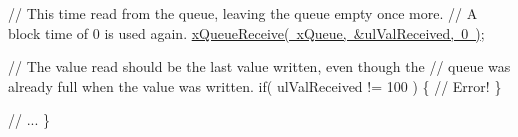 \begin{DoxyPre}    // This time read from the queue, leaving the queue empty once more.
    // A block time of 0 is used again.
    \mbox{\hyperlink{queue_8h_af1549eac0e7f05694a59a0b967c80be3}{xQueueReceive( xQueue, &ulValReceived, 0 )}};\end{DoxyPre}



\begin{DoxyPre}    // The value read should be the last value written, even though the
    // queue was already full when the value was written.
    if( ulValReceived != 100 )
    \{
        // Error!
    \}\end{DoxyPre}



\begin{DoxyPre}    // ...
\}
 \end{DoxyPre}
 